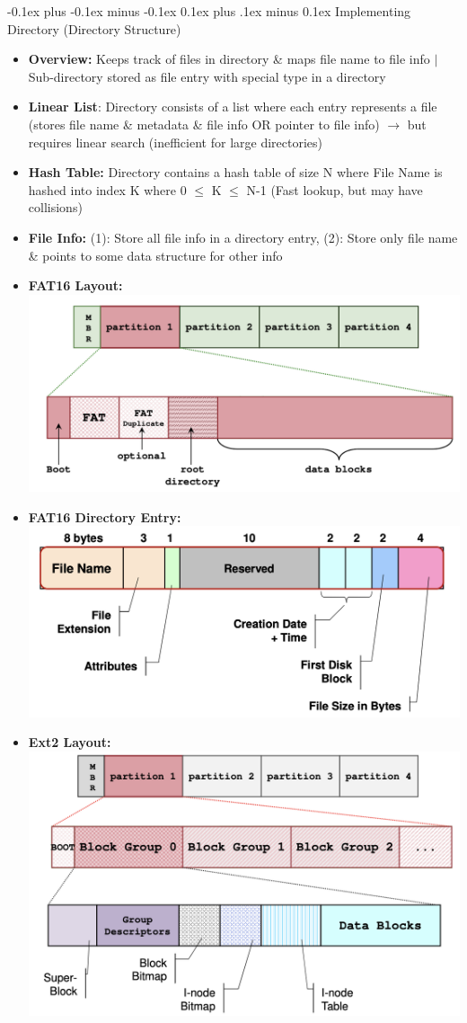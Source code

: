 \documentclass[landscape]{article}
\makeatletter
\renewcommand{\subsection}{\@startsection{subsection}{2}{0mm}%
  {-0.1ex plus -0.1ex minus -0.1ex}%
  {0.1ex plus .1ex minus 0.1ex}%
{\normalfont\scriptsize\bfseries}}
\makeatother
\begin{document}
\begin{multicols*}{6}
    \subsection{Implementing Directory (Directory Structure)}
    \begin{itemize}
      \item \textbf{Overview:} Keeps track of files in directory \& maps file name to file info $\vert$ Sub-directory stored as file entry with special type in a directory
      \item \textbf{Linear List}: Directory consists of a list where each entry represents a file (stores file name \& metadata \& file info OR pointer to file info) $\rightarrow$ but requires linear search (inefficient for large directories)
      \item \textbf{Hash Table:} Directory contains a hash table of size N where File Name is hashed into index K where 0 $\leq$ K $\leq$ N-1 (Fast lookup, but may have collisions)
      \item \textbf{File Info:} (1): Store all file info in a directory entry, (2): Store only file name \& points to some data structure for other info
      \item \textbf{FAT16 Layout:}
      \includegraphics[width=0.75\linewidth]{26_fat16_layout.png}
      \item \textbf{FAT16 Directory Entry:}
      \includegraphics[width=0.75\linewidth]{23_fat16_dir_entry.png}
      \item \textbf{Ext2 Layout:} \\
      \includegraphics[width=0.75\linewidth]{27_ext2_layout.png}

\end{itemize}
\end{multicols*}
\end{document}
